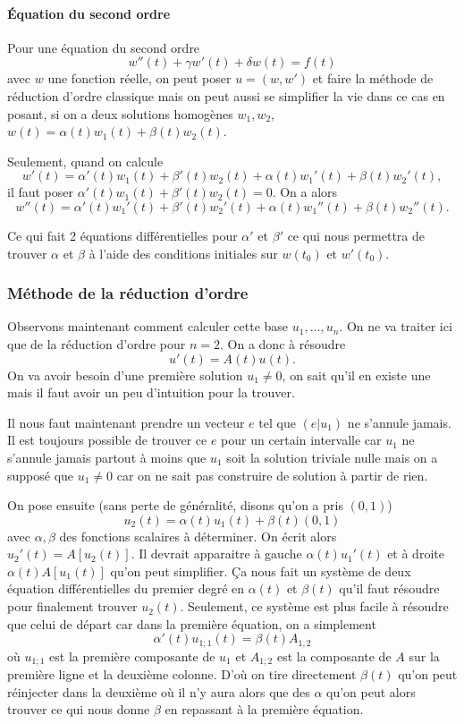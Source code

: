 \paragraph{Équation du second ordre}
Pour une équation du second ordre
\[ w''(t) + \gamma w'(t) + \delta w(t) = f(t) \]
avec $w$ une fonction réelle,
on peut poser $u = (w,w')$ et faire la méthode de réduction d'ordre
classique mais on peut aussi se simplifier la vie dans ce cas en posant,
si on a deux solutions homogènes $w_1,w_2$,
$w(t) = \alpha(t) w_1(t) + \beta(t) w_2(t)$.

Seulement, quand on calcule
\[ w'(t) = \alpha'(t) w_1(t) + \beta'(t) w_2(t)
+ \alpha(t) w_1'(t) + \beta(t) w_2'(t), \]
il faut poser $\alpha'(t) w_1(t) + \beta'(t) w_2(t) = 0$.
On a alors
\[ w''(t) = \alpha'(t) w_1'(t) + \beta'(t) w_2'(t)
+ \alpha(t) w_1''(t) + \beta(t) w_2''(t). \]

Ce qui fait 2 équations différentielles pour $\alpha'$ et $\beta'$ ce qui
nous permettra de trouver $\alpha$ et $\beta$ à l'aide des conditions initiales
sur $w(t_0)$ et $w'(t_0)$.

\subsubsection{Méthode de la réduction d'ordre}
\label{sec:redordre}
Observons maintenant comment calculer cette base $u_1,\ldots,u_n$.
On ne va traiter ici que de la réduction d'ordre pour $n=2$.
On a donc à résoudre
\[ u'(t) = A(t)u(t). \]
On va avoir besoin d'une première solution $u_1 \neq 0$,
on sait qu'il en existe une mais
il faut avoir un peu d'intuition pour la trouver.

Il nous faut maintenant prendre un vecteur $e$ tel que $(e|u_1)$
ne s'annule jamais.
Il est toujours possible de trouver ce $e$ pour un certain intervalle
car $u_1$ ne s'annule jamais partout à moins que
$u_1$ soit la solution triviale nulle mais on a supposé que $u_1 \neq 0$ car
on ne sait pas construire de solution à partir de rien.

On pose ensuite (sans perte de généralité, disons qu'on a pris $(0,1)$)
\[ u_2(t) = \alpha(t)u_1(t) + \beta(t)(0,1) \]
avec $\alpha,\beta$ des fonctions scalaires à déterminer.
On écrit alors $u_2'(t) = A[u_2(t)]$.
Il devrait apparaitre à gauche $\alpha(t) u_1'(t)$ et à droite
$\alpha(t) A[u_1(t)]$ qu'on peut simplifier.
Ça nous fait un système de deux équation différentielles du premier degré
en $\alpha(t)$ et $\beta(t)$ qu'il faut résoudre pour finalement trouver
$u_2(t)$.
Seulement, ce système est plus facile à résoudre que celui de départ
car dans la première équation, on a simplement
\[ \alpha'(t)u_{1;1}(t) = \beta(t)A_{1,2} \]
où $u_{1;1}$ est la première composante de $u_1$ et $A_{1;2}$ est
la composante de $A$ sur la première ligne et la deuxième colonne.
D'où on tire directement $\beta(t)$ qu'on peut réinjecter dans la deuxième
où il n'y aura alors que des $\alpha$ qu'on peut alors trouver ce qui nous
donne $\beta$ en repassant à la première équation.

